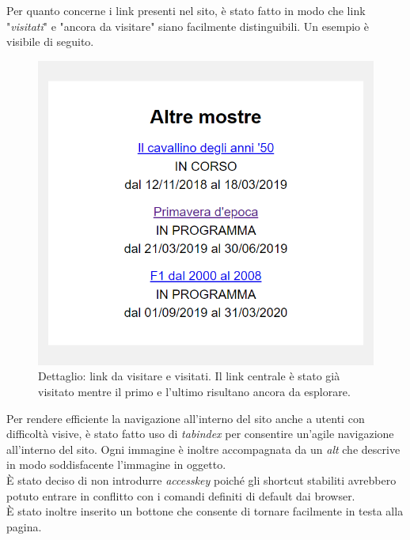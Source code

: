 Per quanto concerne i link presenti nel sito, è stato fatto in modo che link "\textit{visitati}" e "ancora da visitare" siano facilmente distinguibili. Un esempio è visibile di seguito.
\begin{figure}[h]
	\begin{center}
		\includegraphics[scale=1.5]{Images/linkVisitatiDaVisitare.png}
		\caption{Dettaglio: link da visitare e visitati. Il link centrale è stato già visitato mentre il primo e l'ultimo risultano ancora da esplorare.}
	\end{center}
\end{figure}

Per rendere efficiente la navigazione all'interno del sito anche a utenti con difficoltà visive, è stato fatto uso di \textit{tabindex} per consentire un'agile navigazione all'interno del sito. Ogni immagine è inoltre accompagnata da un \textit{alt} che descrive in modo soddisfacente l'immagine in oggetto.\\
È stato deciso di non introdurre \textit{accesskey} poiché gli shortcut stabiliti avrebbero potuto entrare in conflitto con i comandi definiti di default dai browser.\\
È stato inoltre inserito un bottone che consente di tornare facilmente in testa alla pagina.

